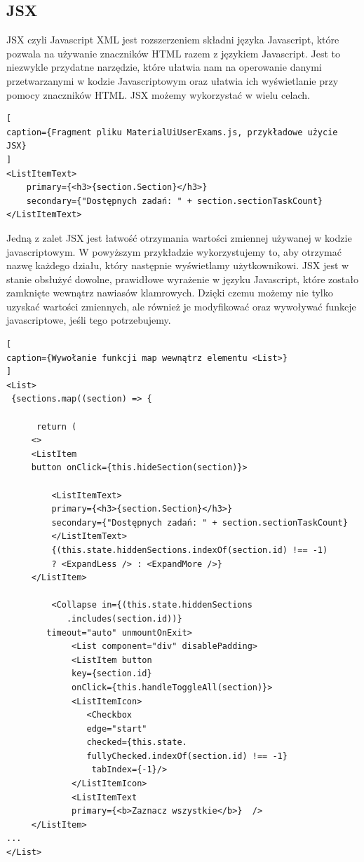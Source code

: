 \documentclass[oneside,polski,logo,indent]{amuthesis}
\begin{document}
\subsection{JSX}

{
JSX czyli Javascript XML jest rozszerzeniem składni języka Javascript, które pozwala na używanie znaczników HTML razem z językiem Javascript. Jest to niezwykle przydatne narzędzie, które ułatwia nam na operowanie danymi przetwarzanymi w kodzie Javascriptowym oraz ułatwia ich wyświetlanie przy pomocy znaczników HTML. JSX możemy wykorzystać w wielu celach.



\begin{lstlisting}[
caption={Fragment pliku MaterialUiUserExams.js, przykładowe użycie JSX}
]
<ListItemText>
	primary={<h3>{section.Section}</h3>}
	secondary={"Dostępnych zadań: " + section.sectionTaskCount}
</ListItemText>
\end{lstlisting}



Jedną z zalet JSX jest łatwość otrzymania wartości zmiennej używanej w kodzie javascriptowym. W powyższym przykładzie wykorzystujemy to, aby otrzymać nazwę każdego działu, który następnie wyświetlamy użytkownikowi.
JSX jest w stanie obsłużyć dowolne, prawidłowe wyrażenie w języku Javascript, które zostało zamknięte wewnątrz nawiasów klamrowych. Dzięki czemu możemy nie tylko uzyskać wartości zmiennych, ale również je modyfikować oraz wywoływać funkcje javascriptowe, jeśli tego potrzebujemy.



\begin{lstlisting}[
caption={Wywołanie funkcji map wewnątrz elementu <List>}
]
<List>
 {sections.map((section) => {
                     
	  return (
	 <>
	 <ListItem
	 button onClick={this.hideSection(section)}>

		 <ListItemText>
		 primary={<h3>{section.Section}</h3>}
		 secondary={"Dostępnych zadań: " + section.sectionTaskCount}
		 </ListItemText>
		 {(this.state.hiddenSections.indexOf(section.id) !== -1)
		 ? <ExpandLess /> : <ExpandMore />}
	 </ListItem>

		 <Collapse in={(this.state.hiddenSections
			.includes(section.id))} 
		timeout="auto" unmountOnExit>
			 <List component="div" disablePadding>
			 <ListItem button
			 key={section.id}
			 onClick={this.handleToggleAll(section)}>
			 <ListItemIcon>
			 	<Checkbox
			 	edge="start"
			 	checked={this.state.
				fullyChecked.indexOf(section.id) !== -1}
				 tabIndex={-1}/>
			 </ListItemIcon>
			 <ListItemText 
			 primary={<b>Zaznacz wszystkie</b>}  />
	 </ListItem>
...
</List>
\end{lstlisting}



}
\end{document}
